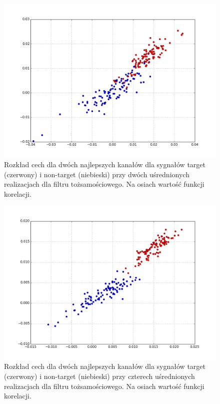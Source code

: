 \documentclass[licencjacka,openright]{pracamgr}
\begin{document}
\begin{figure}
\centering
\includegraphics[scale=0.55, trim=10mm 15mm 10mm 18mm, clip=True]{pics/cecha_toz_2.png}
\caption{Rozkład cech dla dwóch najlepszych kanałów dla sygnałów target (czerwony) i non-target (niebieski) przy dwóch uśrednionych realizacjach dla filtru tożsamościowego. Na osiach wartość funkcji korelacji.}
\label{cecha_toz_2}
\end{figure}

\begin{figure}
\centering
\includegraphics[scale=0.55, trim=10mm 15mm 10mm 18mm, clip=True]{pics/cecha_toz_4.png}
\caption{Rozkład cech dla dwóch najlepszych kanałów dla sygnałów target (czerwony) i non-target (niebieski) przy czterech uśrednionych realizacjach dla filtru tożsamościowego. Na osiach wartość funkcji korelacji.}
\label{cecha_toz_4}
\end{figure}
\end{document}
